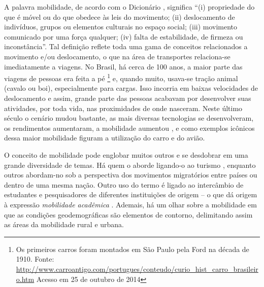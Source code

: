 A palavra mobilidade, de acordo com o Dicionário ,
significa ``(i) propriedade do que é móvel ou do que obedece às leis do movimento;
(ii) deslocamento de indivíduos, grupos ou elementos culturais no espaço social;
(iii) movimento comunicado por uma força qualquer;
(iv) falta de estabilidade, de firmeza ou inconstância''.
Tal definição reflete toda uma gama de conceitos relacionados a movimento e/ou deslocamento, o que na área de transportes relaciona-se imediatamente a viagens.
No Brasil, há cerca de 100 anos, a maior parte das viagens de pessoas era feita a pé%
\footnote{Os primeiros carros foram montados em São Paulo pela Ford na década de 1910. Fonte: \url{http://www.carroantigo.com/portugues/conteudo/curio_hist_carro_brasileiro.htm} Acesso em 25 de outubro de 2014} 
e, quando muito, usava-se tração animal (cavalo ou boi), especialmente para cargas. Isso incorria em baixas velocidades de deslocamento e assim, grande parte das pessoas acabavam por desenvolver suas atividades, por toda vida, nas proximidades de onde nasceram. Neste último século o cenário mudou bastante, as mais diversas tecnologias se desenvolveram, os rendimentos aumentaram, a mobilidade aumentou \cite[p.06]{METZ2012}, e como exemplos icônicos dessa maior mobilidade figuram a utilização do carro e do avião.

O conceito de mobilidade pode englobar muitos outros e se desdobrar em uma grande diversidade de temas.
Há quem o aborde ligando-o ao turismo \cite{ENLOE1989,FROHLICK2008}, enquanto outros \cite{CHANT1992,SILVEY2000} abordam-no sob a perspectiva dos movimentos migratórios entre países ou dentro de uma mesma nação. Outro uso do termo é ligado ao intercâmbio de estudantes e pesquisadores de diferentes instituições de origem – o que dá origem à expressão \emph{mobilidade acadêmica} \cite{ENDERS1998,TREMBLAY2005,HOFFMAN2008}. Ademais, há um olhar sobre a mobilidade em que as condições geodemográficas são elementos de contorno, delimitando assim as áreas da mobilidade rural e urbana.
 

